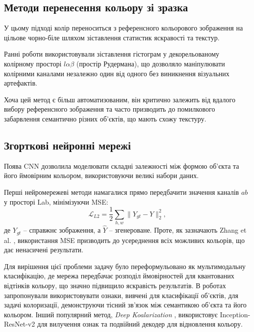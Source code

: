         \subsection{Методи перенесення кольору зі зразка}
            У цьому підході колір переноситься з референсного кольорового зображення на цільове чорно-біле шляхом зіставлення статистик яскравості та текстур.
            
            Ранні роботи \cite{2001-reinhard-color-transfer,2002-welsh-transferring-color} використовували зіставлення гістограм у декорельованому колірному просторі $l\alpha\beta$ (простір Рудермана), що дозволяло маніпулювати колірними каналами незалежно один від одного без виникнення візуальних артефактів.
            
            Хоча цей метод є більш автоматизованим, він критично залежить від вдалого вибору референсного зображення та часто призводить до помилкового забарвлення семантично різних об'єктів, що мають схожу текстуру.

        \subsection{Згорткові нейронні мережі}
            Поява CNN дозволила моделювати складні залежності між формою об'єкта та його ймовірним кольором, використовуючи великі набори даних.

            Перші нейромережеві методи намагалися прямо передбачити значення каналів $ab$ у просторі Lab, мінімізуючи MSE:
            \begin{equation*}
                \mathcal{L}_{L2} = \frac{1}{2} \sum_{h,w} \lVert Y_{gt} - \hat{Y} \rVert_2^2,
            \end{equation*}
            де $Y_{gt}$ -- справжнє зображення, а $\hat{Y}$ -- згенероване. Проте, як зазначають Zhang et al. \cite{2016-colorful-image-colorization}, використання MSE призводить до усереднення всіх можливих кольорів, що дає ненасичені результати.

            Для вирішення цієї проблеми задачу було переформульовано як мультимодальну класифікацію, де мережа передбачає розподіл ймовірностей для квантованих відтінків кольору, що значно підвищило яскравість результатів.
            В роботах \cite{2016-learning-representations-for-automatic-colorization, 2016-colorful-image-colorization} запропонували використовувати ознаки, вивчені для класифікації об'єктів, для задачі колоризації, демонструючи тісний зв'язок між семантикою об'єкта та його кольором.
            Інший популярний метод, \textit{Deep Koalarization} \cite{2017-deep-koalarization}, використовує Inception-ResNet-v2 для вилучення ознак та подвійний декодер для відновлення кольору.

